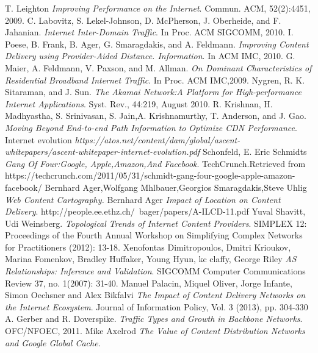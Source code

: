 \begin{thebibliography}{}
T. Leighton
\textit{Improving Performance on the Internet}.
Commun. ACM, 52(2):4451, 2009.
C. Labovitz, S. Lekel-Johnson, D. McPherson, J. Oberheide, and F. Jahanian. 
\textit{Internet Inter-Domain Traffic}.
In Proc. ACM SIGCOMM, 2010.
I. Poese, B. Frank, B. Ager, G. Smaragdakis, and A. Feldmann.
\textit{Improving Content Delivery using Provider-Aided Distance. Information}. 
In ACM IMC, 2010.
G. Maier, A. Feldmann, V. Paxson, and M. Allman.
\textit{On Dominant Characteristics of Residential Broadband Internet Traffic}.
In Proc. ACM IMC,2009.
Nygren, R. K. Sitaraman, and J. Sun. 
\textit{The Akamai Network:A Platform for High-performance Internet Applications}.
Syst. Rev., 44:219, August 2010.
R. Krishnan, H. Madhyastha, S. Srinivasan, S. Jain,A. Krishnamurthy, T.
Anderson, and J. Gao. 
\textit{Moving Beyond End-to-end Path Information to Optimize CDN Performance}.
Internet evolution
\textit{https://atos.net/content/dam/global/ascent-whitepapers/ascent-whitepaper-internet-evolution.pdf}
Schonfeld, E. Eric Schmidts 
\textit{Gang Of Four:Google, Apple,Amazon,And Facebook}.
TechCrunch.Retrieved from https://techcrunch.com/2011/05/31/schmidt-gang-four-google-apple-amazon-facebook/
Bernhard Ager,Wolfgang Mhlbauer,Georgios Smaragdakis,Steve Uhlig
\textit{Web Content Cartography.}
Bernhard Ager 
\textit{Impact of Location on Content Delivery}.
http://people.ee.ethz.ch/~bager/papers/A-ILCD-11.pdf
Yuval Shavitt, Udi Weinsberg.
\textit{Topological Trends of Internet Content Providers}.
SIMPLEX 12: Proceedings of the Fourth Annual Workshop on
Simplifying Complex Networks for Practitioners (2012): 13-18.
Xenofontas Dimitropoulos, Dmitri Krioukov, Marina Fomenkov, Bradley
Huffaker, Young Hyun, kc claffy, George Riley 
\textit{AS Relationships: Inference and Validation}.
SIGCOMM Computer Communications Review 37, no. 1(2007): 31-40.
Manuel Palacin, Miquel Oliver, Jorge Infante, Simon Oechsner and Alex
Bikfalvi 
\textit{The Impact of Content Delivery Networks on the Internet Ecosystem}.
Journal of Information Policy, Vol. 3 (2013), pp. 304-330
A. Gerber and R. Doverspike.
\textit{Traffic Types and Growth in Backbone Networks}.
OFC/NFOEC, 2011.
Mike Axelrod
\textit{The Value of Content Distribution Networks and Google Global Cache}.

\end{thebibliography}

